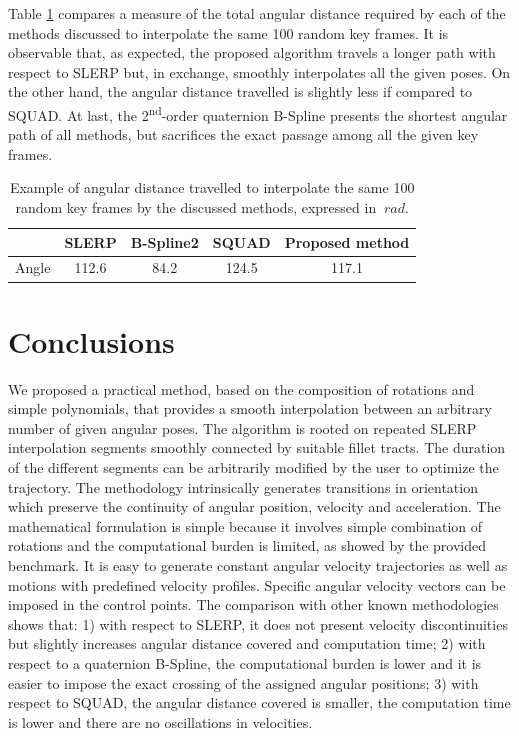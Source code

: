 Table \ref{tab:benchmark_dist} compares a measure of the total angular distance required by each of the methods discussed to interpolate the same 100 random key frames. It is observable that, as expected, the proposed algorithm travels a longer path with respect to SLERP but, in exchange, smoothly interpolates all the given poses. On the other hand, the angular distance travelled is slightly less if compared to SQUAD. At last, the 2\textsuperscript{nd}-order quaternion B-Spline presents the shortest angular path of all methods, but sacrifices the exact passage among all the given key frames.

\begin{table}[tp]
	\centering
	\caption{Example of angular distance travelled to interpolate the same 100 random key frames by the discussed methods, expressed in $\SI{}{rad}$.}
	\setlength{\tabcolsep}{3pt}
	\begin{tabular}{c|cccc}
		\toprule
	    & SLERP & B-Spline2 & SQUAD & Proposed method \\
		\midrule
        Angle & 112.6 & 84.2 & 124.5 & 117.1 \\
		\bottomrule
	\end{tabular}
	\label{tab:benchmark_dist}
\end{table}



\section{Conclusions}
\label{sec:conclusions}
We proposed a practical method, based on the composition of rotations and simple polynomials, that provides a smooth interpolation between an arbitrary number of given angular poses. The algorithm is rooted on repeated SLERP interpolation segments smoothly connected by suitable fillet tracts. The duration of the different segments can be arbitrarily modified by the user to optimize the trajectory. The methodology intrinsically generates transitions in orientation which preserve the continuity of angular position, velocity and acceleration. The mathematical formulation is simple because it involves simple combination of rotations and the computational burden is limited, as showed by the provided benchmark. It is easy to generate constant angular velocity trajectories as well as motions with predefined velocity profiles. Specific angular velocity vectors can be imposed in the control points. The comparison with other known methodologies shows that:
1) with respect to SLERP, it does not present velocity discontinuities but slightly increases angular distance covered and computation time;
2) with respect to a quaternion B-Spline, the computational burden is lower and it is easier to impose the exact crossing of the assigned angular positions;
3) with respect to SQUAD, the angular distance covered is smaller, the computation time is lower and there are no oscillations in velocities. 

